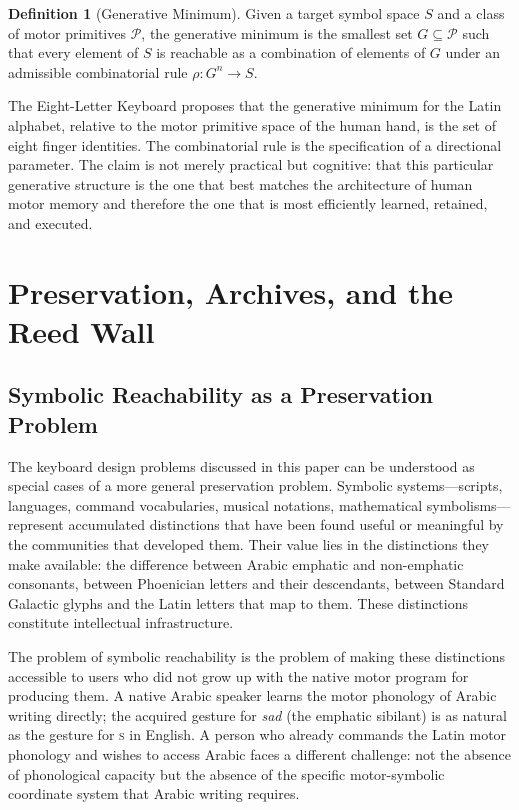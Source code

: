 \documentclass[12pt,a4paper]{article}
\theoremstyle{plain}
\theoremstyle{definition}
\newtheorem{definition}{Definition}
\theoremstyle{remark}
\begin{document}
\begin{definition}[Generative Minimum]
Given a target symbol space $S$ and a class of motor primitives $\mathcal{P}$,
the generative minimum is the smallest set $G \subseteq \mathcal{P}$ such that
every element of $S$ is reachable as a combination of elements of $G$ under
an admissible combinatorial rule $\rho : G^n \to S$.
\end{definition}

The Eight-Letter Keyboard proposes that the generative minimum for the Latin
alphabet, relative to the motor primitive space of the human hand, is the set
of eight finger identities. The combinatorial rule is the specification of a
directional parameter. The claim is not merely practical but cognitive: that
this particular generative structure is the one that best matches the
architecture of human motor memory and therefore the one that is most
efficiently learned, retained, and executed.

\section{Preservation, Archives, and the Reed Wall}

\subsection{Symbolic Reachability as a Preservation Problem}

The keyboard design problems discussed in this paper can be understood as special
cases of a more general preservation problem. Symbolic systems---scripts,
languages, command vocabularies, musical notations, mathematical symbolisms---
represent accumulated distinctions that have been found useful or meaningful
by the communities that developed them. Their value lies in the distinctions
they make available: the difference between Arabic emphatic and non-emphatic
consonants, between Phoenician letters and their descendants, between Standard
Galactic glyphs and the Latin letters that map to them. These distinctions
constitute intellectual infrastructure.

The problem of symbolic reachability is the problem of making these distinctions
accessible to users who did not grow up with the native motor program for
producing them. A native Arabic speaker learns the motor phonology of Arabic
writing directly; the acquired gesture for \textit{sad} (the emphatic sibilant)
is as natural as the gesture for \textsc{s} in English. A person who already
commands the Latin motor
phonology and wishes to access Arabic faces a different challenge: not the
absence of phonological capacity but the absence of the specific motor-symbolic
coordinate system that Arabic writing requires.
\end{document}
